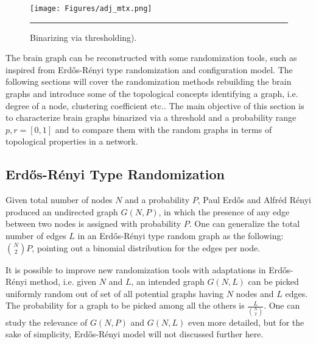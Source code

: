 \begin{figure}[htbp]
  \centering
	\texttt{[image: Figures/adj\_mtx.png]} 
	  
  
    
    \rule{35em}{0.5pt}
  \caption[Binarizing via thresholding]{Binarizing via thresholding).}
  \label{fig:Electron}
\end{figure}


The brain graph can be reconstructed with some randomization tools, such as inspired from Erd\H{o}s-R\'{e}nyi type randomization and configuration model. The following sections will cover the randomization methods rebuilding the brain graphs and introduce some of the topological concepts identifying a graph, i.e. degree of a node, clustering coefficient etc.. The main objective of this section is to characterize brain graphs binarized via a threshold and a probability range $p,r=[0,1]$ and to compare them with the random graphs in terms of topological properties in a network.

\subsection{Erd\H{o}s-R\'{e}nyi Type Randomization}

Given total number of nodes $N$ and a probability $P$, Paul Erd\H{o}s and Alfr\'{e}d R\'{e}nyi produced an undirected graph $G(N,P)$, in which the presence of any edge between two nodes is assigned with probability $P$. 
One can generalize the total number of edges $L$ in an  Erd\H{o}s-R\'{e}nyi type random graph as the following: $\binom {N} {2}P$, pointing out a binomial distribution for the edges per node.

It is possible to improve new randomization tools with adaptations in Erd\H{o}s-R\'{e}nyi method, i.e. given $N$ and $L$, an intended graph $G(N,L)$ can be picked uniformly random out of set of all potential graphs having $N$ nodes and $L$ edges. The probability for a graph to be picked among all the others is $\frac{L}{\binom {N}{2}}  $. One can study the relevance of $G(N,P)$ and $G(N,L)$ even more detailed, but for the sake of simplicity, Erd\H{o}s-R\'{e}nyi model will not discussed further here.

